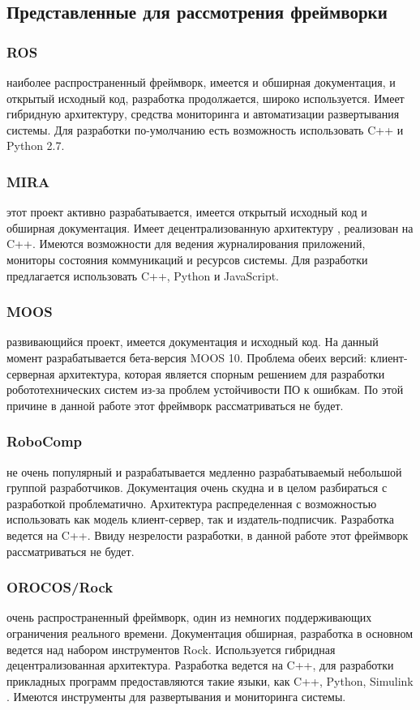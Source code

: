 \subsection{Представленные для рассмотрения фреймворки}

\subsubsection{ROS} наиболее распространенный фреймворк, имеется и обширная документация, и открытый исходный код, разработка продолжается, широко используется. Имеет гибридную архитектуру, средства мониторинга и автоматизации развертывания системы. Для разработки по-умолчанию есть возможность использовать C++ и Python 2.7.

\subsubsection{MIRA} этот проект активно разрабатывается, имеется открытый исходный код и обширная документация. Имеет децентрализованную архитектуру \cite{c2} , реализован на C++. Имеются возможности для ведения журналирования приложений, мониторы состояния коммуникаций и ресурсов системы. Для разработки предлагается использовать C++, Python и JavaScript.

\subsubsection{MOOS} развивающийся проект, имеется документация и исходный код. На данный момент разрабатывается бета-версия MOOS 10. Проблема обеих версий: клиент-серверная архитектура, которая является спорным решением для разработки робототехнических систем из-за проблем устойчивости ПО к ошибкам. По этой причине в данной работе этот фреймворк рассматриваться не будет.

\subsubsection{RoboComp} не очень популярный и разрабатывается медленно разрабатываемый небольшой группой разработчиков. Документация очень скудна и в целом разбираться с разработкой проблематично. Архитектура распределенная с возможностью использовать как модель клиент-сервер, так и издатель-подписчик. Разработка ведется на C++. Ввиду незрелости разработки, в данной работе этот фреймворк рассматриваться не будет.

\subsubsection{OROCOS/Rock} очень распространенный фреймворк, один из немногих поддерживающих ограничения реального времени. Документация обширная, разработка в основном ведется над набором инструментов Rock. Используется гибридная децентрализованная архитектура. Разработка ведется на C++, для разработки прикладных программ предоставляются такие языки, как C++, Python, Simulink \cite{c1}. Имеются инструменты для развертывания и мониторинга системы.

